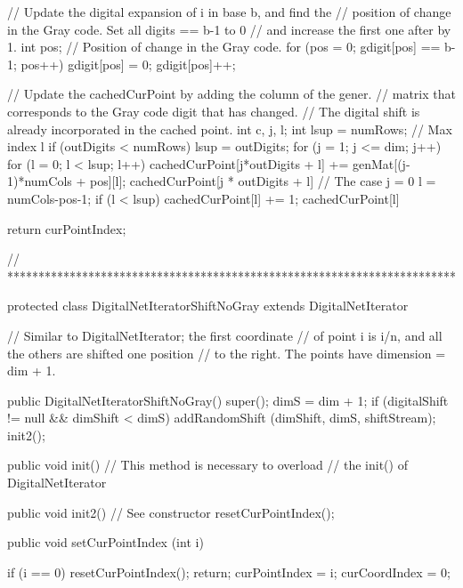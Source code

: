 \begin{code}
\begin{hide}
{{         // Update the digital expansion of i in base b, and find the 
         // position of change in the Gray code. Set all digits == b-1 to 0
         // and increase the first one after by 1.
         int pos;      // Position of change in the Gray code.
         for (pos = 0; gdigit[pos] == b-1; pos++)  
            gdigit[pos] = 0;
         gdigit[pos]++;

         // Update the cachedCurPoint by adding the column of the gener. 
         // matrix that corresponds to the Gray code digit that has changed.
         // The digital shift is already incorporated in the cached point.
         int c, j, l;
         int lsup = numRows;        // Max index l
         if (outDigits < numRows)
            lsup = outDigits;
         for (j = 1; j <= dim; j++) {
            for (l = 0; l < lsup; l++) {
               cachedCurPoint[j*outDigits + l] +=
                   genMat[(j-1)*numCols + pos][l];
               cachedCurPoint[j * outDigits + l] %
            }
         }
         // The case j = 0
         l = numCols-pos-1;
         if (l < lsup) {
            cachedCurPoint[l] += 1;
            cachedCurPoint[l] %
         }

         return curPointIndex;
      }
   }


// ************************************************************************

   protected class DigitalNetIteratorShiftNoGray 
                   extends DigitalNetIterator {
      // Similar to DigitalNetIterator; the first coordinate
      // of point i is i/n, and all the others are shifted one position
      // to the right. The points have dimension = dim + 1.

      public DigitalNetIteratorShiftNoGray() {
         super();
         dimS = dim + 1;
         if (digitalShift != null && dimShift < dimS)
            addRandomShift (dimShift, dimS, shiftStream);
         init2();
      }

      public void init() {   // This method is necessary to overload
      }                      // the init() of DigitalNetIterator 

      public void init2() { // See constructor
         resetCurPointIndex();
      }

      public void setCurPointIndex (int i) {
         if (i == 0) {
            resetCurPointIndex();
            return;
         }
         curPointIndex = i;
         curCoordIndex = 0;

}}
\end{hide}
\end{code}
